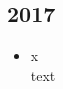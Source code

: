 \subsection{2017}
\begin{history}


    \begin{itemize}

        \item x\\
              text

    \end{itemize}

\end{history}
